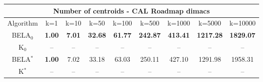 \begin{tabular}{c|cccccccc}\toprule
\multicolumn{9}{c}{Number of centroids - CAL Roadmap dimacs}\\ \midrule
Algorithm & k=1 & k=10 & k=50 & k=100 & k=500 & k=1000 & k=5000 & k=10000 \\ \midrule
BELA$_0$ & \textbf{1.00} & \textbf{7.01} & \textbf{32.68} & \textbf{61.77} & \textbf{242.87} & \textbf{413.41} & \textbf{1217.28} & \textbf{1829.07} \\
K$_0$ & -- & -- & -- & -- & -- & -- & -- & -- \\
BELA$^*$ & \textbf{1.00} & 7.02 & 33.18 & 63.03 & 250.11 & 427.10 & 1291.98 & 1958.31 \\
K$^*$ & -- & -- & -- & -- & -- & -- & -- & -- \\ \bottomrule 
\end{tabular}
